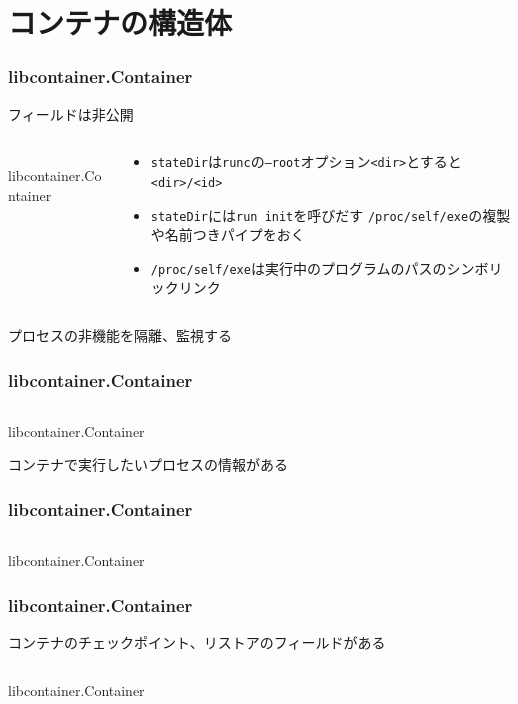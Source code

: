 \documentclass[unicode, 14pt, aspectratio=169]{beamer}
\begin{document}
\section{コンテナの構造体}
\begin{frame}
  \frametitle{libcontainer.Container}
  フィールドは非公開
  \begin{columns}
    \begin{column}{0.5\textwidth}
      \begin{center}
        \inputminted{go}{code/container.go}
        libcontainer.Container\supercite{libcontainer}
      \end{center}
    \end{column}
    \begin{column}{0.5\textwidth}  %
      \begin{itemize}[leftmargin=0.2cm,label=$\circ$]
        \item \texttt{stateDir}は\texttt{runc}の\texttt{--root}オプション\texttt{<dir>}とすると\texttt{<dir>/<id>}
        \item \texttt{stateDir}には\texttt{run init}を呼びだす \texttt{/proc/self/exe}の複製や名前つきパイプをおく
        \item \texttt{/proc/self/exe}は実行中のプログラムのパスのシンボリックリンク
      \end{itemize}
    \end{column}
\end{columns}
\end{frame}
\begin{frame}
  プロセスの非機能を隔離、監視\supercite{rdt}する
  \frametitle{libcontainer.Container}
  \begin{center}
    \inputminted{go}{code/container2.go}
    libcontainer.Container\supercite{libcontainer}
  \end{center}
\end{frame}
\begin{frame}
  コンテナで実行したいプロセスの情報がある
  \frametitle{libcontainer.Container}
  \begin{center}
    \inputminted{go}{code/container3.go}
    libcontainer.Container\supercite{libcontainer}
  \end{center}
\end{frame}
\begin{frame}[t]
  \frametitle{libcontainer.Container}
  コンテナのチェックポイント、リストアのフィールドがある\supercite{criu}
  \begin{center}
    \inputminted{go}{code/container4.go}
    libcontainer.Container\supercite{libcontainer}
  \end{center}
\end{frame}
\end{document}
